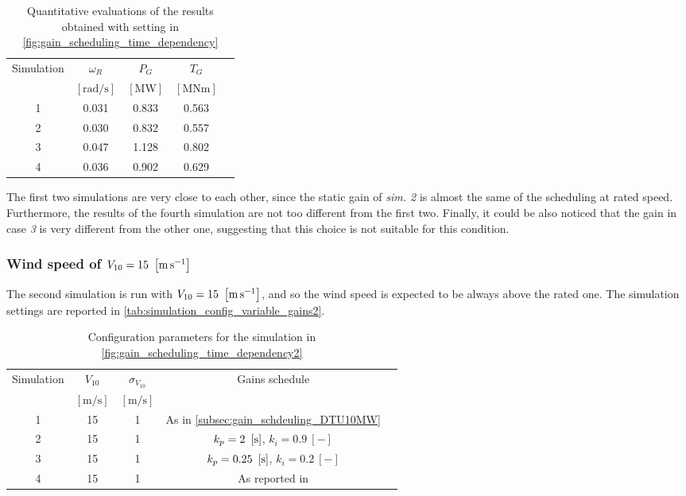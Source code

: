 \begin{table}[htb]
  \caption{Quantitative evaluations of the results obtained with setting in \autoref{fig:gain_scheduling_time_dependency}}
  \centering
  \begin{tabular}{ccccc}
  \toprule
    Simulation & $\omega_R$  & $P_G$ & $T_G$ \\ 
     & $\left[\si{\radian\per\second}\right]$ & $\left[\si{\mega\watt}\right]$ &$\left[\si{\mega\newton\meter}\right]$ \\ \midrule       
     1 & 0.031 & 0.833 & 0.563 \\
     2 & 0.030 & 0.832 & 0.557 \\
     3 & 0.047 & 1.128 & 0.802 \\
     4 & 0.036 & 0.902 & 0.629 \\
     \bottomrule
  \end{tabular}
  \label{tab:res_variable_gains}
\end{table}
The first two simulations are very close to each other, since the static gain of \textit{sim. 2} is almost the same of the scheduling at rated speed. Furthermore, the results of the fourth simulation are not too different from the first two. Finally, it could be also noticed that the gain in case \textit{3} is very different from the other one, suggesting that this choice is not suitable for this condition. 

\subsubsection{Wind speed of $V_{10}=15 \ \left[\si{\meter\per\second}\right]$}
The second simulation is run with $V_{10}=15 \ \left[\si{\meter\per\second}\right]$, and so the wind speed is expected to be always above the rated one. The simulation settings are reported in \autoref{tab:simulation_config_variable_gains2}.
\begin{table}[htb]
  \caption{Configuration parameters for the simulation in \autoref{fig:gain_scheduling_time_dependency2}}
  \centering
  \begin{tabular}{ccccc}
  \toprule
    Simulation & $V_{10}$  & $\sigma_{V_{10}}$ & Gains schedule \\ 
     & $\left[\si{\meter\per\second}\right]$ & $\left[\si{\meter\per\second}\right]$ & \\ \midrule       
     1 & 15 & 1 & As in \autoref{subsec:gain_schdeuling_DTU10MW}  \\
     2 & 15 & 1 & $k_p = 2 \ \mesunt{\second}$, $k_i=0.9 \ [-]$ \\
     3 & 15 & 1 & $k_p = 0.25 \ \mesunt{\second}$, $k_i=0.2 \ [-]$  \\
     4 & 15 & 1 & As reported in \cite{Olimpo_Anaya‐Lara}  \\
     \bottomrule
  \end{tabular}
  \label{tab:simulation_config_variable_gains2}
\end{table}

